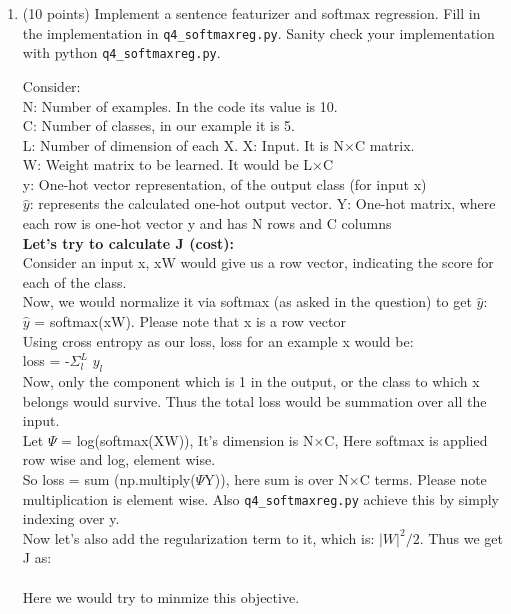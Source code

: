 \documentclass[11pt]{report}
\begin{document}
\renewcommand{\labelenumi}{(\alph{enumi})}
\begin{enumerate}
 \item (10 points) Implement a sentence featurizer and softmax regression. Fill in the implementation in
 {\tt q4\_softmaxreg.py}. Sanity check your implementation with python {\tt q4\_softmaxreg.py}.
 {\color{blue} 
 Consider:\\
 N: Number of examples. In the code its value is 10.\\
 C: Number of classes, in our example it is 5.\\
 L: Number of dimension of each X.
 X: Input. It is N$\times$C matrix.\\
 W: Weight matrix to be learned. It would be L$\times$C\\
 y: One-hot vector representation, of the output class (for input x)\\
 $\hat{y}$: represents the calculated one-hot output vector.
 Y: One-hot matrix, where each row is one-hot vector y and has N rows and C columns\\
 
 \textbf{Let's try to calculate J (cost):}\\ 
 Consider an input x, xW would give us a row vector, indicating the score for each of the class.\\
 Now, we would normalize it via softmax (as asked in the question) to get $\hat{y}$:\\
 $\hat{y}$ = softmax(xW). Please note that x is a row vector\\
 Using cross entropy as our loss, loss for an example x would be:\\
 loss = -$\Sigma_{l}^{L}$ $y_l$ \\
 Now, only the component which is 1 in the output, or the class to which x belongs would survive. Thus the total loss would be summation over all the input.\\
 Let $\Psi$ = log(softmax(XW)), It's dimension is N$\times$C, Here softmax is applied row wise and log, element wise.\\
 So loss = sum (np.multiply($\Psi$Y)), here sum is over N$\times$C terms. Please note multiplication is element wise. Also {\tt q4\_softmaxreg.py} achieve this by simply indexing over y.\\
 Now let's also add the regularization term to it, which is: $|W|^2/2$. Thus we get J as:\\
  \\
 Here we would try to minmize this objective.
 
}
\end{enumerate}
\end{document}
